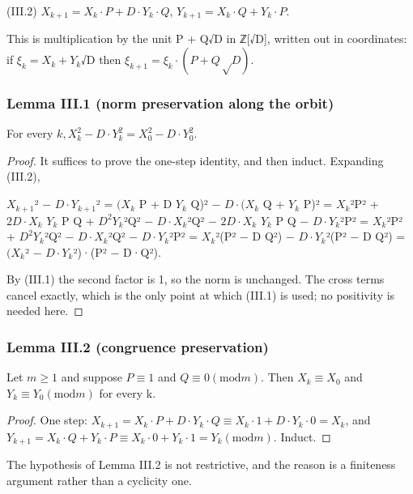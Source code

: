 (III.2)  $X_{k+1} = X_{k}·P + D·Y_{k}·Q$,   $Y_{k+1} = X_{k}·Q + Y_{k}·P$.

This is multiplication by the unit P + Q√D in ℤ[√D], written out in coordinates: if $ξ_{k} = X_{k} + Y_{k}$√D then $ξ_{k+1} = ξ_{k}·(P + Q√D)$.

\subsubsection*{Lemma III.1 (norm preservation along the orbit)}
For every $k, X_{k}^{2} − D·Y_{k}^{2} = X_{0}^{2} − D·Y_{0}^{2}$.

\begin{proof}
It suffices to prove the one-step identity, and then induct. Expanding (III.2),

$X_{k+1}$² − $D·Y_{k+1}$²     = $(X_{k}$ P + D $Y_{k}$ Q)² − $D·(X_{k}$ Q + $Y_{k}$ P)²     = $X_{k}$²P² + $2D·X_{k}$ $Y_{k}$ P Q + $D^{2}Y_{k}$²Q² − $D·X_{k}$²Q² − $2D·X_{k}$ $Y_{k}$ P Q − $D·Y_{k}$²P²     = $X_{k}$²P² + $D^{2}Y_{k}$²Q² − $D·X_{k}$²Q² − $D·Y_{k}$²P²     = $X_{k}$²(P² − D Q²) − $D·Y_{k}$²(P² − D Q²)     = $(X_{k}$² − $D·Y_{k}$²)·(P² − D·Q²).

By (III.1) the second factor is 1, so the norm is unchanged. The cross terms cancel exactly, which is the only point at which (III.1) is used; no positivity is needed here.

\end{proof}
\subsubsection*{Lemma III.2 (congruence preservation)}
Let $m ≥ 1$ and suppose $P ≡ 1$ and $Q ≡ 0 (\mathrm{mod} m)$. Then $X_{k} ≡ X_{0}$ and $Y_{k} ≡ Y_{0} (\mathrm{mod} m)$ for every k.

\begin{proof}
One step: $X_{k+1} = X_{k}·P + D·Y_{k}·Q ≡ X_{k}·1 + D·Y_{k}·0 = X_{k}$, and $Y_{k+1} = X_{k}·Q + Y_{k}·P ≡ X_{k}·0 + Y_{k}·1 = Y_{k} (\mathrm{mod} m)$. Induct.

\end{proof}
The hypothesis of Lemma III.2 is not restrictive, and the reason is a finiteness argument rather than a cyclicity one.

